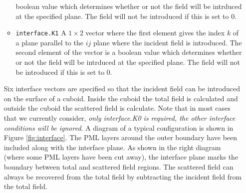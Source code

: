 \documentclass[a4paper, 12pt]{article}
\begin{document}
\begin{itemize}
\begin{itemize}
			boolean value which determines whether or not the field will be
			intrduced at the specified plane. The field will not be introduced
			if this is set to 0.    
			\item \verb+interface.K1+ A $1\times 2$ vector where the first element
			gives the index $k$ of a plane parallel to the $ij$ plane where the
			incident field is introduced. The second element of the vector is a
			boolean value which determines whether or not the field will be
			intrduced at the specified plane. The field will not be introduced
			if this is set to 0.     
		\end{itemize}
		\label{sec:cuboid}
		Six interface vectors are specified so that the incident field can be
		introduced on the surface of a cuboid. Inside the cuboid the total
		field is calculated and outside the cuboid the scattered field is
		calculate. Note that in most cases that we currently consider,
		\emph{only interface.K0 is required, the other interface
			conditions will be ignored}.  A diagram of a typical configuration
		is shown in Figure \ref{fig:interface}. The PML layers around the
		outer boundary have been included along with the interface
		plane. As shown in the right diagram (where some PML layers have been
		cut away), the interface plane marks the boundary between total and
		scattered field regions. The scattered field can always be recovered
		from the total field
		by subtracting the incident field from the total field. 
		

\end{itemize}
\end{document}
